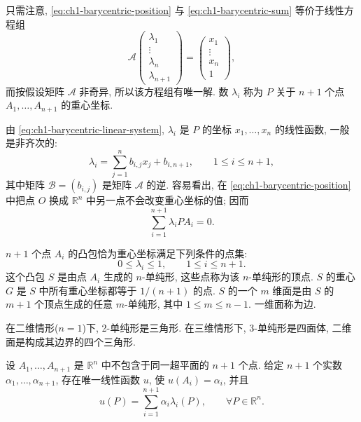 只需注意, \eqref{eq:ch1-barycentric-position} 与 \eqref{eq:ch1-barycentric-sum} 等价于线性方程组
\begin{equation}
\mathcal A
\begin{pmatrix}
\lambda_1\\ \vdots\\ \lambda_n\\ \lambda_{n+1}
\end{pmatrix}
=
\begin{pmatrix}
x_1\\ \vdots\\ x_n\\ 1
\end{pmatrix},
\label{eq:ch1-barycentric-linear-system}
\end{equation}
而按假设矩阵 $\mathcal A$ 非奇异, 所以该方程组有唯一解. 数 $\lambda_i$ 称为 $P$ 关于 $n+1$ 个点 $A_1,\ldots,A_{n+1}$ 的重心坐标.

由 \eqref{eq:ch1-barycentric-linear-system}, $\lambda_i$ 是 $P$ 的坐标 $x_1,\ldots,x_n$ 的线性函数, 一般是非齐次的:
\begin{equation}
\lambda_i=\sum_{j=1}^nb_{i,j}x_j+b_{i,n+1},
\qquad1\leq i\leq n+1,
\label{eq:ch1-barycentric-affine-functions}
\end{equation}
其中矩阵 $\mathcal B=(b_{i,j})$ 是矩阵 $\mathcal A$ 的逆. 容易看出, 在 \eqref{eq:ch1-barycentric-position} 中把点 $O$ 换成 $\mathbb R^n$ 中另一点不会改变重心坐标的值; 因而
\begin{equation}
\sum_{i=1}^{n+1}\lambda_iPA_i=0.
\label{eq:ch1-barycentric-vector-identity}
\end{equation}

$n+1$ 个点 $A_i$ 的凸包恰为重心坐标满足下列条件的点集:
\begin{equation}
0\leq\lambda_i\leq1,\qquad1\leq i\leq n+1.
\label{eq:ch1-simplex-barycentric-bounds}
\end{equation}
这个凸包 $S$ 是由点 $A_i$ 生成的 $n$-单纯形, 这些点称为该 $n$-单纯形的顶点. $S$ 的重心 $G$ 是 $S$ 中所有重心坐标都等于 $1/(n+1)$ 的点. $S$ 的一个 $m$ 维面是由 $S$ 的 $m+1$ 个顶点生成的任意 $m$-单纯形, 其中 $1\leq m\leq n-1$. 一维面称为边.

在二维情形($n=1$)下, 2-单纯形是三角形. 在三维情形下, 3-单纯形是四面体, 二维面是构成其边界的四个三角形.

\begin{Proposition}
\label{prop:ch1-linear-barycentric-interpolation}
设 $A_1,\ldots,A_{n+1}$ 是 $\mathbb R^n$ 中不包含于同一超平面的 $n+1$ 个点. 给定 $n+1$ 个实数 $\alpha_1,\ldots,\alpha_{n+1}$, 存在唯一线性函数 $u$, 使 $u(A_i)=\alpha_i$, 并且
\begin{equation}
u(P)=\sum_{i=1}^{n+1}\alpha_i\lambda_i(P),
\qquad\forall P\in\mathbb R^n.
\label{eq:ch1-linear-barycentric-interpolation}
\end{equation}
\end{Proposition}

